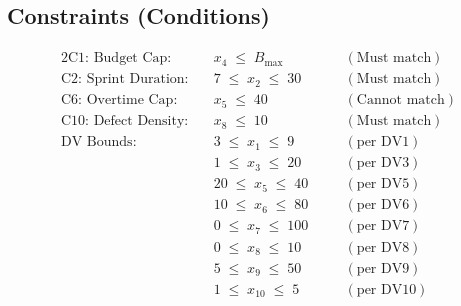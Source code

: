 \documentclass{article}
\begin{document}
\subsection*{Constraints (Conditions)}
\begin{alignat*}{2}
\text{C1: Budget Cap:}     &\quad x_4 \;\le\; B_{\max}             &&\quad (\text{Must match}) \\
\text{C2: Sprint Duration:}&\quad 7 \;\le\; x_2 \;\le\; 30        &&\quad (\text{Must match}) \\
\text{C6: Overtime Cap:}    &\quad x_5 \;\le\; 40                 &&\quad (\text{Cannot match}) \\
\text{C10: Defect Density:}&\quad x_8 \;\le\; 10                  &&\quad (\text{Must match}) \\
\text{DV Bounds:}           &\quad 3 \;\le\; x_1 \;\le\; 9         &&\quad (\text{per DV1}) \\
                           &\quad 1 \;\le\; x_3 \;\le\; 20        &&\quad (\text{per DV3}) \\
                           &\quad 20 \;\le\; x_5 \;\le\; 40       &&\quad (\text{per DV5}) \\
                           &\quad 10 \;\le\; x_6 \;\le\; 80       &&\quad (\text{per DV6}) \\
                           &\quad 0  \;\le\; x_7 \;\le\; 100      &&\quad (\text{per DV7}) \\
                           &\quad 0  \;\le\; x_8 \;\le\; 10       &&\quad (\text{per DV8}) \\
                           &\quad 5  \;\le\; x_9 \;\le\; 50       &&\quad (\text{per DV9}) \\
                           &\quad 1  \;\le\; x_{10} \;\le\; 5     &&\quad (\text{per DV10})
\end{alignat*}
\end{document}
